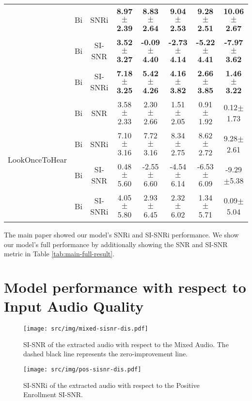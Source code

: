 \begin{table}[t]
\begin{center}
{\begin{tabular}{lccccccc}
       & Bi & SNRi & \textbf{8.97$\pm$2.39} & \textbf{8.83$\pm$2.64} & \textbf{9.04$\pm$2.53} & \textbf{9.28$\pm$2.51} & \textbf{10.06$\pm$2.67} \\
       & Bi & SI-SNR & \textbf{3.52$\pm$3.27} & \textbf{-0.09$\pm$4.40} & \textbf{-2.73$\pm$4.14} & \textbf{-5.22$\pm$4.41} & \textbf{-7.97$\pm$3.62} \\
       & Bi & SI-SNRi & \textbf{7.18$\pm$3.25} & \textbf{5.42$\pm$4.26} & \textbf{4.16$\pm$3.82} & \textbf{2.66$\pm$3.85} & \textbf{1.46$\pm$3.22} \\
\midrule
\multirow{4}{*}{LookOnceToHear \cite{Veluri2024lookonce}} & Bi & SNR    & 3.58$\pm$2.33 & 2.30$\pm$2.66 & 1.51$\pm$2.05 & 0.91$\pm$1.92 & 0.12$\pm$1.73 \\
         & Bi & SNRi   & 7.10$\pm$3.16 & 7.72$\pm$3.16 & 8.34$\pm$2.75 & 8.62$\pm$2.72 & 9.28$\pm$2.61 \\
         & Bi & SI-SNR & 0.48$\pm$5.60 & -2.55$\pm$6.60 & -4.54$\pm$6.14 & -6.53$\pm$6.09 & -9.29$\pm$5.38 \\
         & Bi & SI-SNRi & 4.05$\pm$5.80 & 2.93$\pm$6.45 & 2.32$\pm$6.02 & 1.34$\pm$5.71 & 0.09$\pm$5.04 \\
\bottomrule
\end{tabular}}
\end{center}
\vskip -0.1in
\end{table}

The main paper showed our model's SNRi and SI-SNRi performance. We show our model's full performance by additionally showing the SNR and SI-SNR metric in Table \ref{tab:main-full-result}.


\section{Model performance with respect to Input Audio Quality}

\begin{figure*}[t]
\centering
\begin{small}
\begin{minipage}{0.49\textwidth}
    \centering
    \texttt{[image: src/img/mixed-sisnr-dis.pdf]}
    \caption{SI-SNR of the extracted audio with respect to the Mixed Audio. The dashed black line represents the zero-improvement line.}
    \label{fig:mixed-sisnr-dis}
\end{minipage}
\hfill
\begin{minipage}{0.49\textwidth}
    \centering
    \texttt{[image: src/img/pos-sisnr-dis.pdf]}
    \caption{SI-SNRi of the extracted audio with respect to the Positive Enrollment SI-SNR.}
    \label{fig:pos-sisnr-dis}
\end{minipage}
\end{small}
\vskip -0.1in
\end{figure*}




